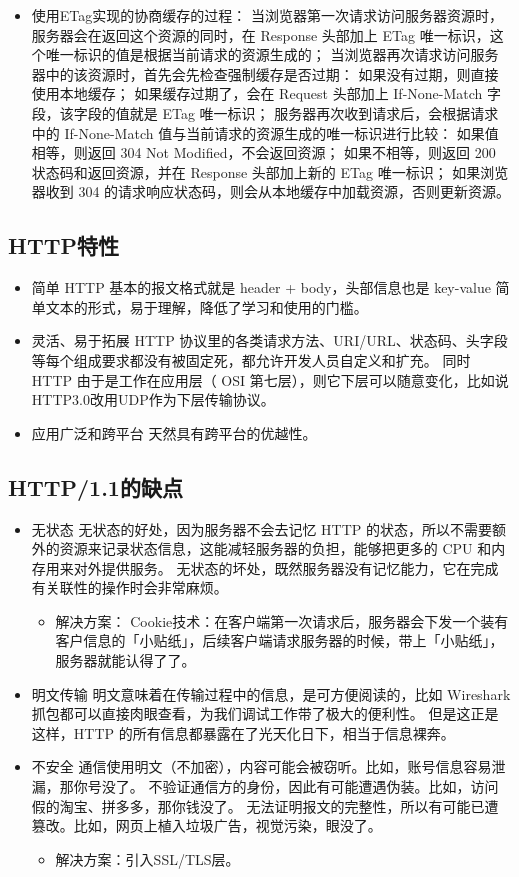 \documentclass[11pt]{article}
\begin{document}
\begin{itemize}
\begin{itemize}
\item 使用ETag实现的协商缓存的过程：
当浏览器第一次请求访问服务器资源时，服务器会在返回这个资源的同时，在 Response 头部加上 ETag 唯一标识，这个唯一标识的值是根据当前请求的资源生成的；
当浏览器再次请求访问服务器中的该资源时，首先会先检查强制缓存是否过期：
  如果没有过期，则直接使用本地缓存；
  如果缓存过期了，会在 Request 头部加上 If-None-Match 字段，该字段的值就是 ETag 唯一标识；
服务器再次收到请求后，会根据请求中的 If-None-Match 值与当前请求的资源生成的唯一标识进行比较：
  如果值相等，则返回 304 Not Modified，不会返回资源；
  如果不相等，则返回 200 状态码和返回资源，并在 Response 头部加上新的 ETag 唯一标识；
如果浏览器收到 304 的请求响应状态码，则会从本地缓存中加载资源，否则更新资源。
\end{itemize}
\end{itemize}
\subsection{HTTP特性}
\label{sec:orgf922cdf}
\begin{itemize}
\item 简单
HTTP 基本的报文格式就是 header + body，头部信息也是 key-value 简单文本的形式，易于理解，降低了学习和使用的门槛。
\item 灵活、易于拓展
HTTP 协议里的各类请求方法、URI/URL、状态码、头字段等每个组成要求都没有被固定死，都允许开发人员自定义和扩充。
同时 HTTP 由于是工作在应用层（ OSI 第七层），则它下层可以随意变化，比如说\- HTTP3.0改用UDP作为下层传输协议。
\item 应用广泛和跨平台
天然具有跨平台的优越性。
\end{itemize}
\subsection{HTTP/1.1的缺点}
\label{sec:orge12255c}
\begin{itemize}
\item 无状态
无状态的好处，因为服务器不会去记忆 HTTP 的状态，所以不需要额外的资源来记录状态信息，这能减轻服务器的负担，能够把更多的 CPU 和内存用来对外提供服务。
无状态的坏处，既然服务器没有记忆能力，它在完成有关联性的操作时会非常麻烦。
\begin{itemize}
\item 解决方案：
Cookie技术：在客户端第一次请求后，服务器会下发一个装有客户信息的「小贴纸」，后续客户端请求服务器的时候，带上「小贴纸」，服务器就能认得了了。
\end{itemize}
\item 明文传输
明文意味着在传输过程中的信息，是可方便阅读的，比如 Wireshark 抓包都可以直接肉眼查看，为我们调试工作带了极大的便利性。
但是这正是这样，HTTP 的所有信息都暴露在了光天化日下，相当于信息裸奔。
\item 不安全
通信使用明文（不加密），内容可能会被窃听。比如，账号信息容易泄漏，那你号没了。
不验证通信方的身份，因此有可能遭遇伪装。比如，访问假的淘宝、拼多多，那你钱没了。
无法证明报文的完整性，所以有可能已遭篡改。比如，网页上植入垃圾广告，视觉污染，眼没了。
\begin{itemize}
\item 解决方案：引入SSL/TLS层。
\end{itemize}
\end{itemize}
\end{document}
